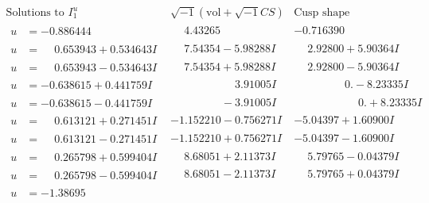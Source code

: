 \documentclass[1p]{elsarticle_modified}
\theoremstyle{definition}
\newcommand{\I}{\sqrt{-1}}
\begin{document}
$$\begin{array}{c|c|c}  
\text{Solutions to }I^u_{1}& \I (\text{vol} + \sqrt{-1}CS) & \text{Cusp shape}\\
 \hline 
\begin{aligned}
u &= -0.886444\phantom{ +0.000000I}\end{aligned}
 & \phantom{-}4.43265\phantom{ +0.000000I} & -0.716390\phantom{ +0.000000I} \\ \hline\begin{aligned}
u &= \phantom{-}0.653943 + 0.534643 I\end{aligned}
 & \phantom{-}7.54354 - 5.98288 I & \phantom{-}2.92800 + 5.90364 I \\ \hline\begin{aligned}
u &= \phantom{-}0.653943 - 0.534643 I\end{aligned}
 & \phantom{-}7.54354 + 5.98288 I & \phantom{-}2.92800 - 5.90364 I \\ \hline\begin{aligned}
u &= -0.638615 + 0.441759 I\end{aligned}
 & \phantom{-0.000000 -}3.91005 I & \phantom{-0.000000 } 0. - 8.23335 I \\ \hline\begin{aligned}
u &= -0.638615 - 0.441759 I\end{aligned}
 & \phantom{-0.000000 } -3.91005 I & \phantom{-0.000000 -}0. + 8.23335 I \\ \hline\begin{aligned}
u &= \phantom{-}0.613121 + 0.271451 I\end{aligned}
 & -1.152210 - 0.756271 I & -5.04397 + 1.60900 I \\ \hline\begin{aligned}
u &= \phantom{-}0.613121 - 0.271451 I\end{aligned}
 & -1.152210 + 0.756271 I & -5.04397 - 1.60900 I \\ \hline\begin{aligned}
u &= \phantom{-}0.265798 + 0.599404 I\end{aligned}
 & \phantom{-}8.68051 + 2.11373 I & \phantom{-}5.79765 - 0.04379 I \\ \hline\begin{aligned}
u &= \phantom{-}0.265798 - 0.599404 I\end{aligned}
 & \phantom{-}8.68051 - 2.11373 I & \phantom{-}5.79765 + 0.04379 I \\ \hline\begin{aligned}
u &= -1.38695\phantom{ +0.000000I}\end{aligned}

\end{array}$$
\end{document}
